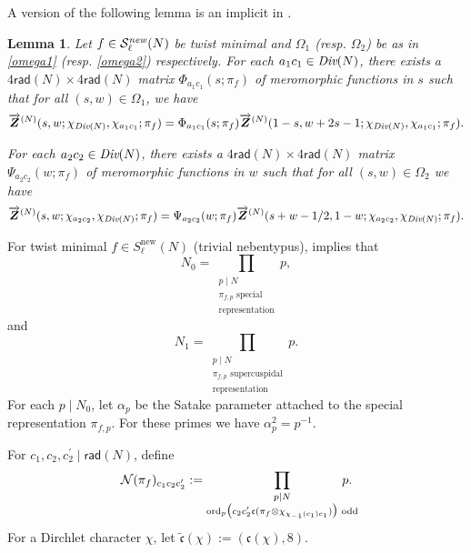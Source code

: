 \documentclass[12pt,reqno]{amsart}
\theoremstyle{plain}
\newtheorem{lemma}{Lemma}
\theoremstyle{remark}
\numberwithin{equation}{section}
\numberwithin{lemma}{section}
\numberwithin{theorem}{section}
\numberwithin{prop}{section}
\numberwithin{remark}{section}
\begin{document}
A version of the following lemma is an implicit in \cite{HK}. 
\begin{lemma} \label{matrixfunc}
Let $f \in \mathcal{S}^{\text{\emph{new}}}_{\ell}(N)$ be twist minimal and $\Omega_1$ 
\emph{(}resp. $\Omega_2$\emph{)} be as in \eqref{omega1} 
\emph{(}resp. \eqref{omega2}\emph{)} 
respectively. For each $a_1 c_1 \in \emph{Div}(N)$, there exists a 
$4 \mathsf{rad}(N) \times 4 \mathsf{rad}(N)$ matrix $\Phi_{a_1 c_1}(s;\pi_f)$ of meromorphic 
functions in $s$ such that 
for all $(s,w) \in \Omega_1$, we have 
\begin{equation} \label{exacfunc1}
\overrightarrow{\boldsymbol{Z}}^{(N)}(s,w; \chi_{\emph{Div}(N)}, \chi_{a_1 c_1};\pi_f)= 
\Phi_{a_1 c_1}(s;\pi_f) \overrightarrow{\boldsymbol{Z}}^{(N)}(1-s,w+2s-1; \chi_{\emph{Div}(N)}, \chi_{a_1 c_1};\pi_f).
\end{equation}

For each $a_2 c_2 \in \emph{Div}(N)$, there exists a 
$4 \mathsf{rad}(N) \times 4 \mathsf{rad}(N)$ matrix $\Psi_{a_2 c_2}(w;\pi_f)$ of meromorphic 
functions in $w$ such that 
for all $(s,w) \in \Omega_2$ we have 
\begin{equation} \label{exacfunc2}
\overrightarrow{\boldsymbol{Z}}^{(N)}(s,w; \chi_{a_2 c_2}, \chi_{\emph{Div}(N)};\pi_f)= 
\Psi_{a_2 c_2}(w;\pi_f) \overrightarrow{\boldsymbol{Z}}^{(N)}(s+w-1/2,1-w; \chi_{a_2 c_2}, \chi_{\emph{Div}(N)};\pi_f).
\end{equation}
\end{lemma}

For twist minimal $f \in S^{\text{new}}_{\ell}(N)$ (trivial nebentypus), \cite[Proposition~2.8]{LW} implies that
\begin{equation} \label{Nzero}
N_0=\prod_{\substack{p \mid N \\ \pi_{f,p} \text{ special} \\ \text{representation}}} p,
\end{equation}
and 
\begin{equation} \label{None}
N_1=\prod_{\substack{p \mid N \\ \pi_{f,p} \text{ supercuspidal} \\ \text{representation}}} p.
\end{equation}
For each $p \mid N_0$, let $\alpha_p$ be the Satake parameter attached to the special representation 
$\pi_{f,p}$. For these primes we have $\alpha_p^2=p^{-1}$.



For $c_1,c_2,c_2^{\prime} \mid \mathsf{rad}(N)$,
define
\begin{equation} \label{specialprod}
\mathcal{N}(\pi_f)_{c_1 c_2 c_2^{\prime}}:=\prod_{\substack{p \mid N 
 \\ \text{ord}_p \big(c_2 c_2^{\prime} \mathfrak{c} (\pi_f \otimes \chi_{\chi_{-1}(c_1)c_1}) \big) \text{ odd}   }}  \hspace{-0.5cm} p.
\end{equation}
For a Dirchlet character $\chi$, let $\widetilde{\mathfrak{c}}(\chi):=(\mathfrak{c}(\chi),8)$.
 
\end{document}
